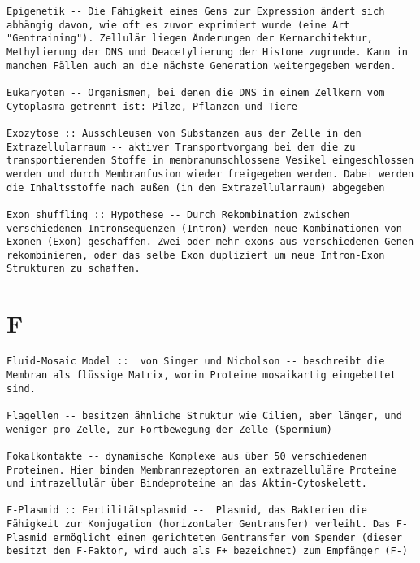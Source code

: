 \documentclass{article}
\begin{document}
\begin{verbatim}
Epigenetik -- Die Fähigkeit eines Gens zur Expression ändert sich abhängig davon, wie oft es zuvor exprimiert wurde (eine Art "Gentraining"). Zellulär liegen Änderungen der Kernarchitektur, Methylierung der DNS und Deacetylierung der Histone zugrunde. Kann in manchen Fällen auch an die nächste Generation weitergegeben werden.

Eukaryoten -- Organismen, bei denen die DNS in einem Zellkern vom Cytoplasma getrennt ist: Pilze, Pflanzen und Tiere

Exozytose :: Ausschleusen von Substanzen aus der Zelle in den Extrazellularraum -- aktiver Transportvorgang bei dem die zu transportierenden Stoffe in membranumschlossene Vesikel eingeschlossen werden und durch Membranfusion wieder freigegeben werden. Dabei werden die Inhaltsstoffe nach außen (in den Extrazellularraum) abgegeben

Exon shuffling :: Hypothese -- Durch Rekombination zwischen verschiedenen Intronsequenzen (Intron) werden neue Kombinationen von Exonen (Exon) geschaffen. Zwei oder mehr exons aus verschiedenen Genen rekombinieren, oder das selbe Exon dupliziert um neue Intron-Exon Strukturen zu schaffen.
\end{verbatim}
\newpage


\section{F}
\begin{verbatim}
Fluid-Mosaic Model ::  von Singer und Nicholson -- beschreibt die Membran als flüssige Matrix, worin Proteine mosaikartig eingebettet sind.

Flagellen -- besitzen ähnliche Struktur wie Cilien, aber länger, und weniger pro Zelle, zur Fortbewegung der Zelle (Spermium) 

Fokalkontakte -- dynamische Komplexe aus über 50 verschiedenen Proteinen. Hier binden Membranrezeptoren an extrazelluläre Proteine und intrazellulär über Bindeproteine an das Aktin-Cytoskelett.

F-Plasmid :: Fertilitätsplasmid --  Plasmid, das Bakterien die Fähigkeit zur Konjugation (horizontaler Gentransfer) verleiht. Das F-Plasmid ermöglicht einen gerichteten Gentransfer vom Spender (dieser besitzt den F-Faktor, wird auch als F+ bezeichnet) zum Empfänger (F-)

\end{verbatim}
\newpage
\end{document}
